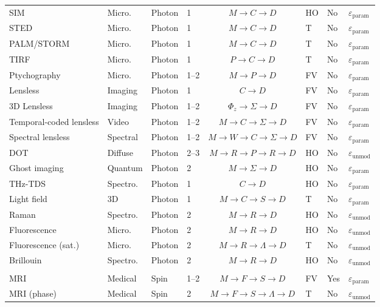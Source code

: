 \documentclass[11pt,a4paper]{article}
\newcommand{\eps}{\varepsilon}
\begin{document}
\begin{table}[htbp]
\begin{tabularx}{\textwidth}{@{}llllclll@{}}
SIM & Micro. & Photon & 1 & $M \to C \to D$ & HO & No & $\eps_{\text{param}}$ \\
STED & Micro. & Photon & 1 & $M \to C \to D$ & T & No & $\eps_{\text{param}}$ \\
PALM/STORM & Micro. & Photon & 1 & $M \to C \to D$ & T & No & $\eps_{\text{param}}$ \\
TIRF & Micro. & Photon & 1 & $P \to C \to D$ & T & No & $\eps_{\text{param}}$ \\
Ptychography & Micro. & Photon & 1--2 & $M \to P \to D$ & FV & No & $\eps_{\text{param}}$ \\
Lensless & Imaging & Photon & 1 & $C \to D$ & FV & No & $\eps_{\text{param}}$ \\
3D Lensless & Imaging & Photon & 1--2 & $\Phi_z \to \Sigma \to D$ & FV & No & $\eps_{\text{param}}$ \\
Temporal-coded lensless & Video & Photon & 1--2 & $M \to C \to \Sigma \to D$ & FV & No & $\eps_{\text{param}}$ \\
Spectral lensless & Spectral & Photon & 1--2 & $M \to W \to C \to \Sigma \to D$ & FV & No & $\eps_{\text{param}}$ \\
DOT & Diffuse & Photon & 2--3 & $M \to R \to P \to R \to D$ & HO & No & $\eps_{\text{unmod}}$ \\
Ghost imaging & Quantum & Photon & 2 & $M \to \Sigma \to D$ & HO & No & $\eps_{\text{param}}$ \\
THz-TDS & Spectro. & Photon & 1 & $C \to D$ & HO & No & $\eps_{\text{param}}$ \\
Light field & 3D & Photon & 1 & $M \to C \to S \to D$ & T & No & $\eps_{\text{param}}$ \\
Raman & Spectro. & Photon & 2 & $M \to R \to D$ & HO & No & $\eps_{\text{unmod}}$ \\
Fluorescence & Micro. & Photon & 2 & $M \to R \to D$ & HO & No & $\eps_{\text{unmod}}$ \\
Fluorescence (sat.) & Micro. & Photon & 2 & $M \to R \to \Lambda \to D$ & T & No & $\eps_{\text{unmod}}$ \\
Brillouin & Spectro. & Photon & 2 & $M \to R \to D$ & HO & No & $\eps_{\text{unmod}}$ \\
\addlinespace
\multicolumn{8}{@{}l}{\textit{Spin}} \\
MRI & Medical & Spin & 1--2 & $M \to F \to S \to D$ & FV & Yes & $\eps_{\text{param}}$ \\
MRI (phase) & Medical & Spin & 2 & $M \to F \to S \to \Lambda \to D$ & T & No & $\eps_{\text{unmod}}$ \\

\end{tabularx}
\end{table}
\end{document}
